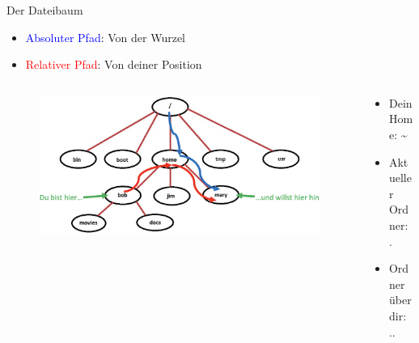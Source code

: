 \documentclass[t, xcolor=dvipsnames]{beamer}
\begin{document}
\begin{frame}{Der Dateibaum}

    \begin{itemize}
        \item \textcolor{blue}{Absoluter Pfad}: Von der Wurzel
        \item \textcolor{red}{Relativer Pfad}: Von deiner Position
    \end{itemize}

    \begin{columns}
	\begin{column}{0.65\textwidth}
\begin{figure}
    \centering
    \includegraphics[width=1\textwidth]{graphics/dateipfad}
\end{figure}
	\end{column}
	\begin{column}{0.35\textwidth}
	
	    \begin{block}{}
	       \begin{itemize}
	           \item Dein Home: \textasciitilde
	           \item Aktueller Ordner: .
	           \item Ordner über dir: ..
	       \end{itemize}
	    \end{block}
    	
	\end{column}
\end{columns}
    
\end{frame}
\end{document}
